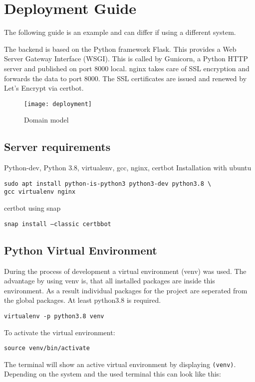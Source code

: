 \author{Paul Hoffmann}
\graphicspath{ {./src/chapters/developer/media/} }

\chapter{Deployment Guide}
The following guide is an example and can differ if using a different system.

The backend is based on the Python framework Flask.
This provides a Web Server Gateway Interface (WSGI).
This is called by Gunicorn, a Python HTTP server and published on port 8000 local.
nginx takes care of SSL encryption and forwards the data to port 8000.
The SSL certificates are issued and renewed by Let's Encrypt via certbot.

\begin{figure}[H]
    \centering
    \texttt{[image: deployment]}
    \caption{Domain model}
\end{figure}


\section{Server requirements}
Python-dev, Python 3.8, virtualenv, gcc, nginx, certbot Installation with ubuntu

\texttt{sudo apt install python-is-python3 python3-dev python3.8 \textbackslash \\gcc virtualenv nginx}

certbot using snap

\texttt{snap install --classic certbbot}

\section{Python Virtual Environment}
During the process of development a virtual environment (venv) was used.
The advantage by using venv is, that all installed packages are inside this environment.
As a result individual packages for the project are seperated from the global packages.
At least python3.8 is required.

\texttt{virtualenv -p python3.8 venv}

To activate the virtual environment:

\texttt{source venv/bin/activate}

The terminal will show an active virtual environment by displaying \texttt{(venv)}.
Depending on the system and the used terminal this can look like this:


